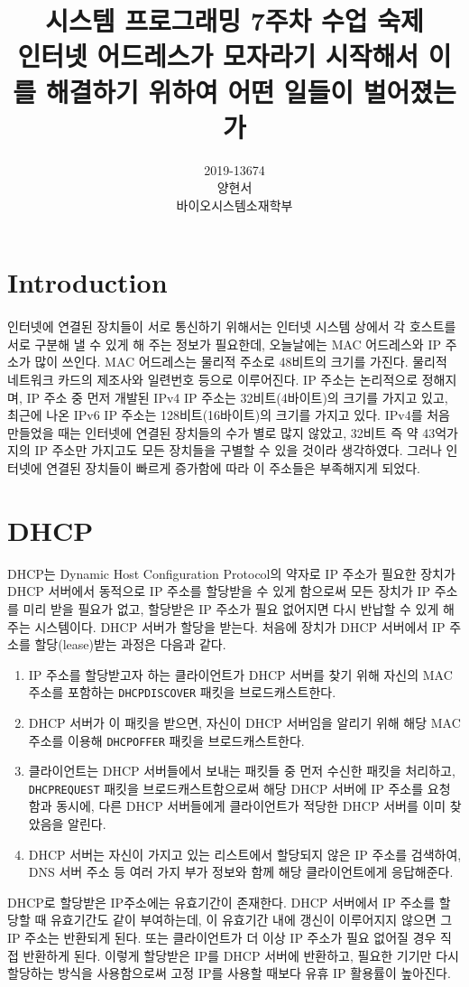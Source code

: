 \documentclass{report}
\title{시스템 프로그래밍 7주차 수업 숙제\\
\large 인터넷 어드레스가 모자라기 시작해서 이를 해결하기 위하여 어떤 일들이 벌어졌는가}
\date{}
\author{
  2019-13674\\
  양현서 \\
  바이오시스템소재학부\\
}
\begin{document}
\maketitle
\tableofcontents

\section{Introduction}
\paragraph{}
인터넷에 연결된 장치들이 서로 통신하기 위해서는 인터넷 시스템 상에서 각 호스트를 서로 구분해 낼 수 있게 해 주는 정보가 필요한데, 오늘날에는 MAC 어드레스와 IP 주소가 많이 쓰인다. MAC 어드레스는 물리적 주소로 48비트의 크기를 가진다. 물리적 네트워크 카드의 제조사와 일련번호 등으로 이루어진다. IP 주소는 논리적으로 정해지며, IP 주소 중 먼저 개발된 IPv4 IP 주소는 32비트(4바이트)의 크기를 가지고 있고, 최근에 나온 IPv6 IP 주소는 128비트(16바이트)의 크기를 가지고 있다. IPv4를 처음 만들었을 때는 인터넷에 연결된 장치들의 수가 별로 많지 않았고, 32비트 즉 약 43억가지의 IP 주소만 가지고도 모든 장치들을 구별할 수 있을 것이라 생각하였다. 그러나 인터넷에 연결된 장치들이 빠르게 증가함에 따라 이 주소들은 부족해지게 되었다. 

\section{DHCP}
DHCP는 Dynamic Host Configuration Protocol의 약자로 IP 주소가 필요한 장치가 DHCP 서버에서 동적으로 IP 주소를 할당받을 수 있게 함으로써 모든 장치가 IP 주소를 미리 받을 필요가 없고, 할당받은 IP 주소가 필요 없어지면 다시 반납할 수 있게 해주는 시스템이다. DHCP 서버가 할당을 받는다. 
처음에 장치가 DHCP 서버에서 IP 주소를 할당(lease)받는 과정은 다음과 같다.
\begin{enumerate}
  \item IP 주소를 할당받고자 하는 클라이언트가 DHCP 서버를 찾기 위해 자신의 MAC 주소를 포함하는 \lstinline{DHCPDISCOVER} 패킷을 브로드캐스트한다.
  \item DHCP 서버가 이 패킷을 받으면, 자신이 DHCP 서버임을 알리기 위해 해당 MAC 주소를 이용해 \lstinline{DHCPOFFER} 패킷을 브로드캐스트한다.
  \item 클라이언트는 DHCP 서버들에서 보내는 패킷들 중 먼저 수신한 패킷을 처리하고, \lstinline{DHCPREQUEST} 패킷을 브로드캐스트함으로써 해당 DHCP 서버에 IP 주소를 요청함과 동시에, 다른 DHCP 서버들에게 클라이언트가 적당한 DHCP 서버를 이미 찾았음을 알린다.
  \item DHCP 서버는 자신이 가지고 있는 리스트에서 할당되지 않은 IP 주소를 검색하여, DNS 서버 주소 등 여러 가지 부가 정보와 함께 해당 클라이언트에게 응답해준다.
\end{enumerate}
DHCP로 할당받은 IP주소에는 유효기간이 존재한다. DHCP 서버에서 IP 주소를 할당할 때 유효기간도 같이 부여하는데, 이 유효기간 내에 갱신이 이루어지지 않으면 그 IP 주소는 반환되게 된다. 또는 클라이언트가 더 이상 IP 주소가 필요 없어질 경우 직접 반환하게 된다. 이렇게 할당받은 IP를 DHCP 서버에 반환하고, 필요한 기기만 다시 할당하는 방식을 사용함으로써 고정 IP를 사용할 때보다 유휴 IP 활용률이 높아진다.
\end{document}
